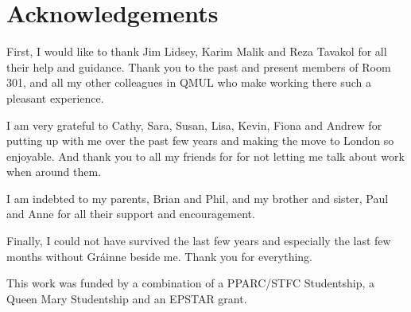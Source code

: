 \renewcommand{\CVSrevision}{\version$Id: acknowledgements.tex,v 1.5 2009/11/30 14:46:57 ith Exp $}
% 
% 
\chapter*{Acknowledgements}
\label{ch:acknowledgements}

First, I would like to thank Jim Lidsey, Karim Malik and Reza Tavakol for all their help and
guidance. Thank you to the past and present members of Room 301, and all my other colleagues in
QMUL who make working there such a pleasant experience.

I am very grateful to Cathy, Sara, Susan, Lisa, Kevin, Fiona and Andrew for putting up with me over
the past few years and making the move to London so enjoyable. And thank you to all my friends for
for not letting me talk about work when around them.

I am indebted to my parents, Brian and Phil, and my brother and sister, Paul and Anne for all
their support and encouragement. 

Finally, I could not have survived the last few years and especially the last few months without 
Gr\'{a}inne beside me. Thank you for everything.

\vfill

This work was funded by a combination of a PPARC/STFC Studentship, a Queen Mary Studentship and an
EPSTAR grant.  


